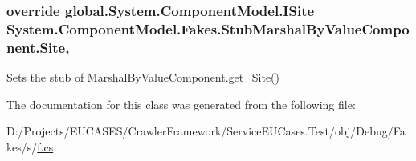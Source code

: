 \hypertarget{class_system_1_1_component_model_1_1_fakes_1_1_stub_marshal_by_value_component_a2b1c094847d7c2872ea0d07dbbc5dd2e}{
\subsubsection[{Site}]{\setlength{\rightskip}{0pt plus 5cm}override global.\-System.\-Component\-Model.\-I\-Site System.\-Component\-Model.\-Fakes.\-Stub\-Marshal\-By\-Value\-Component.\-Site\hspace{0.3cm}{\ttfamily [get]}, {\ttfamily [set]}}}\label{class_system_1_1_component_model_1_1_fakes_1_1_stub_marshal_by_value_component_a2b1c094847d7c2872ea0d07dbbc5dd2e}


Sets the stub of Marshal\-By\-Value\-Component.\-get\-\_\-\-Site()



The documentation for this class was generated from the following file\-:\begin{DoxyCompactItemize}
\item 
D\-:/\-Projects/\-E\-U\-C\-A\-S\-E\-S/\-Crawler\-Framework/\-Service\-E\-U\-Cases.\-Test/obj/\-Debug/\-Fakes/s/\hyperlink{s_2f_8cs}{f.\-cs}\end{DoxyCompactItemize}
